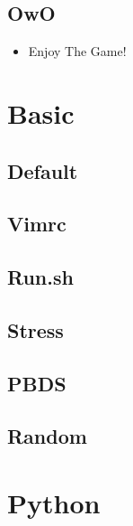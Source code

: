 \documentclass[a4paper,10pt,twocolumn,oneside]{article}
\begin{document}
\subsection{OwO}
\begin{itemize}[nolistsep]
\item Enjoy The Game!
\end{itemize}


\section{Basic}

\subsection{Default}


\subsection{Vimrc}


\subsection{Run.sh}


\subsection{Stress}


\subsection{PBDS}


\subsection{Random}


\section{Python}
\end{document}
